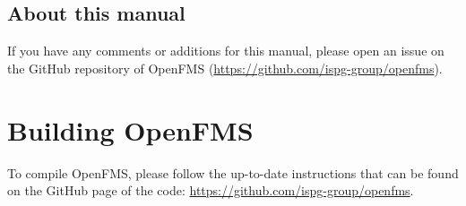 \documentclass[11pt]{article}
\begin{document}
\subsection{About this manual}

If you have any comments or additions for this manual, please open an issue on the GitHub repository of OpenFMS (\url{https://github.com/ispg-group/openfms}).

\newpage \section{Building OpenFMS}
\label{build}

To compile OpenFMS, please follow the up-to-date instructions that can be found on the GitHub page of the code: \url{https://github.com/ispg-group/openfms}.




\end{document}
